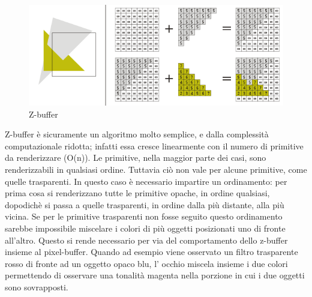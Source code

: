 \begin{figure}[htb]
 \centering
 \includegraphics[width=1.0\linewidth]{images/chapter_stato_arte/stato_arte_z_buffer.png}\hfill
 \caption[Z-buffer]{Z-buffer}
 \label{fig:stato_arte_z_buffer}
\end{figure}

Z-buffer è sicuramente un algoritmo molto semplice, e dalla complessità computazionale ridotta; infatti essa cresce linearmente con il numero di primitive da renderizzare (O(n)). Le primitive, nella maggior parte dei casi, sono renderizzabili in qualsiasi ordine. Tuttavia ciò non vale per alcune primitive, come quelle trasparenti. In questo caso è necessario impartire un ordinamento: per prima cosa si renderizzano tutte le primitive opache, in ordine qualsiasi, dopodichè si passa a quelle trasparenti, in ordine dalla più distante, alla più vicina. 
Se per le primitive trasparenti non fosse seguito questo ordinamento sarebbe impossibile miscelare i colori di più oggetti posizionati uno di fronte all’altro. Questo si rende necessario per via del comportamento dello z-buffer insieme al pixel-buffer.
Quando ad esempio viene osservato un filtro trasparente rosso di fronte ad un oggetto opaco blu, l’ occhio miscela insieme i due colori permettendo di osservare una tonalità magenta nella porzione in cui i due oggetti sono sovrapposti.
